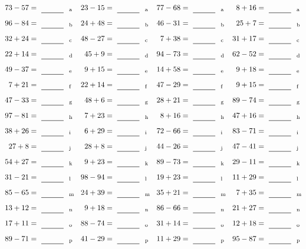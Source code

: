 \documentclass
[
  draft    = true,
  fontsize = 11pt,
  parskip  = half-
]
{scrartcl}
\begin{document}
\clearpage
\begin{align*}
    \pline{73-57}&=\rline{a}
  & \pline{23-15}&=\rline{a}
  & \pline{77-68}&=\rline{a}
  & \pline{8+16}&=\rline{a} \\[1ex]
    \pline{96-84}&=\rline{b}
  & \pline{24+48}&=\rline{b}
  & \pline{46-31}&=\rline{b}
  & \pline{25+7}&=\rline{b} \\[1ex]
    \pline{32+24}&=\rline{c}
  & \pline{48-27}&=\rline{c}
  & \pline{7+38}&=\rline{c}
  & \pline{31+17}&=\rline{c} \\[1ex]
    \pline{22+14}&=\rline{d}
  & \pline{45+9}&=\rline{d}
  & \pline{94-73}&=\rline{d}
  & \pline{62-52}&=\rline{d} \\[1ex]
    \pline{49-37}&=\rline{e}
  & \pline{9+15}&=\rline{e}
  & \pline{14+58}&=\rline{e}
  & \pline{9+18}&=\rline{e} \\[1ex]
    \pline{7+21}&=\rline{f}
  & \pline{22+14}&=\rline{f}
  & \pline{47-29}&=\rline{f}
  & \pline{9+15}&=\rline{f} \\[1ex]
    \pline{47-33}&=\rline{g}
  & \pline{48+6}&=\rline{g}
  & \pline{28+21}&=\rline{g}
  & \pline{89-74}&=\rline{g} \\[1ex]
    \pline{97-81}&=\rline{h}
  & \pline{7+23}&=\rline{h}
  & \pline{8+16}&=\rline{h}
  & \pline{47+16}&=\rline{h} \\[1ex]
    \pline{38+26}&=\rline{i}
  & \pline{6+29}&=\rline{i}
  & \pline{72-66}&=\rline{i}
  & \pline{83-71}&=\rline{i} \\[1ex]
    \pline{27+8}&=\rline{j}
  & \pline{28+8}&=\rline{j}
  & \pline{44-26}&=\rline{j}
  & \pline{47-41}&=\rline{j} \\[1ex]
    \pline{54+27}&=\rline{k}
  & \pline{9+23}&=\rline{k}
  & \pline{89-73}&=\rline{k}
  & \pline{29-11}&=\rline{k} \\[1ex]
    \pline{31-21}&=\rline{l}
  & \pline{98-94}&=\rline{l}
  & \pline{19+23}&=\rline{l}
  & \pline{11+29}&=\rline{l} \\[1ex]
    \pline{85-65}&=\rline{m}
  & \pline{24+39}&=\rline{m}
  & \pline{35+21}&=\rline{m}
  & \pline{7+35}&=\rline{m} \\[1ex]
    \pline{13+12}&=\rline{n}
  & \pline{9+18}&=\rline{n}
  & \pline{86-66}&=\rline{n}
  & \pline{21+27}&=\rline{n} \\[1ex]
    \pline{17+11}&=\rline{o}
  & \pline{88-74}&=\rline{o}
  & \pline{31+14}&=\rline{o}
  & \pline{12+18}&=\rline{o} \\[1ex]
    \pline{89-71}&=\rline{p}
  & \pline{41-29}&=\rline{p}
  & \pline{11+29}&=\rline{p}
  & \pline{95-87}&=\rline{p}
\end{align*}
\end{document}
